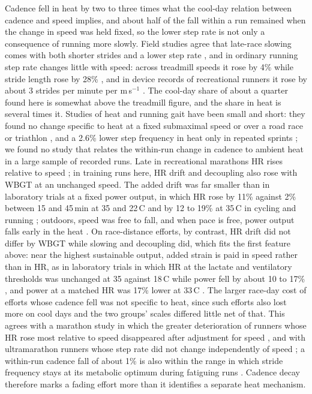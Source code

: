 \documentclass[12pt]{article}
\newcommand{\degC}{\,\textdegree C}
\begin{document}
Cadence fell in heat by two to three times what the cool-day relation between cadence and speed implies, and about half of the fall within a run remained when the change in speed was held fixed, so the lower step rate is not only a consequence of running more slowly. Field studies agree that late-race slowing comes with both shorter strides and a lower step rate \cite{hanley2020,hirakawa2026,winter2017,giovanelli2017}, and in ordinary running step rate changes little with speed: across treadmill speeds it rose by 4\% while stride length rose by 28\% \cite{cavanagh1989}, and in device records of recreational runners it rose by about 3 strides per minute per m\,s$^{-1}$ \cite{vanoeveren2019}. The cool-day share of about a quarter found here is somewhat above the treadmill figure, and the share in heat is several times it. Studies of heat and running gait have been small and short: they found no change specific to heat at a fixed submaximal speed \cite{mtibaa2019,girard2017} or over a road race or triathlon \cite{dejonglempke2025,james2025}, and a 2.6\% lower step frequency in heat only in repeated sprints \cite{girard2017}; we found no study that relates the within-run change in cadence to ambient heat in a large sample of recorded runs. Late in recreational marathons HR rises relative to speed \cite{smyth2022,billat2020}; in training runs here, HR drift and decoupling also rose with WBGT at an unchanged speed. The added drift was far smaller than in laboratory trials at a fixed power output, in which HR rose by 11\% against 2\% between 15 and 45\,min at 35 and 22\degC{} \cite{lafrenz2008} and by 12 to 19\% at 35\degC{} in cycling and running \cite{wingo2005,wingo2020}; outdoors, speed was free to fall, and when pace is free, power output falls early in the heat \cite{tucker2004}. On race-distance efforts, by contrast, HR drift did not differ by WBGT while slowing and decoupling did, which fits the first feature above: near the highest sustainable output, added strain is paid in speed rather than in HR, as in laboratory trials in which HR at the lactate and ventilatory thresholds was unchanged at 35 against 18\degC{} while power fell by about 10 to 17\% \cite{maunder2021}, and power at a matched HR was 17\% lower at 33\degC{} \cite{charoensap2023}. The larger race-day cost of efforts whose cadence fell was not specific to heat, since such efforts also lost more on cool days and the two groups' scales differed little net of that. This agrees with a marathon study in which the greater deterioration of runners whose HR rose most relative to speed disappeared after adjustment for speed \cite{hunter2026b}, and with ultramarathon runners whose step rate did not change independently of speed \cite{burns2019}; a within-run cadence fall of about 1\% is also within the range in which stride frequency stays at its metabolic optimum during fatiguing runs \cite{hunter2007,vernillo2019}. Cadence decay therefore marks a fading effort more than it identifies a separate heat mechanism.
\end{document}
